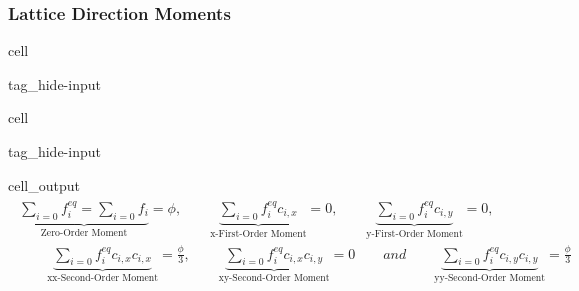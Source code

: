 \documentclass[letterpaper,10pt,english,openany,oneside]{jupyterBook}
\begin{document}
\subsubsection{Lattice Direction Moments}
\label{\detokenize{LBM-Study/Diffusive-Equation:lattice-direction-moments}}
\begin{sphinxuseclass}{cell}
\begin{sphinxuseclass}{tag_hide-input}
\end{sphinxuseclass}
\end{sphinxuseclass}
\begin{sphinxuseclass}{cell}
\begin{sphinxuseclass}{tag_hide-input}\begin{sphinxVerbatimOutput}

\begin{sphinxuseclass}{cell_output}\begin{equation*}
\begin{split}\displaystyle \begin{gathered}\underbrace{\sum_{i=0} f_{i}^{eq} =\sum_{i=0} f_{i} }_{\textrm{Zero-Order Moment}} =\phi,\quad \quad \underbrace{\sum_{i=0} f_{i}^{eq}c_{i,x} }_{\textrm{x-First-Order Moment}} =0,\quad \quad \underbrace{\sum_{i=0} f_{i}^{eq}c_{i,y} }_{\textrm{y-First-Order Moment}} =0,\\ \quad \quad \underbrace{\sum_{i=0} f_{i}^{eq}c_{i,x}c_{i,x} }_{\textrm{xx-Second-Order Moment}} =\frac{\phi}{3},\quad \quad \underbrace{\sum_{i=0} f_{i}^{eq}c_{i,x}c_{i,y} }_{\textrm{xy-Second-Order Moment}} =0 \quad \quad and \quad \quad \underbrace{\sum_{i=0} f_{i}^{eq}c_{i,y}c_{i,y} }_{\textrm{yy-Second-Order Moment}} =\frac{\phi}{3}\end{gathered}\end{split}
\end{equation*}
\end{sphinxuseclass}\end{sphinxVerbatimOutput}

\end{sphinxuseclass}
\end{sphinxuseclass}
\end{document}
